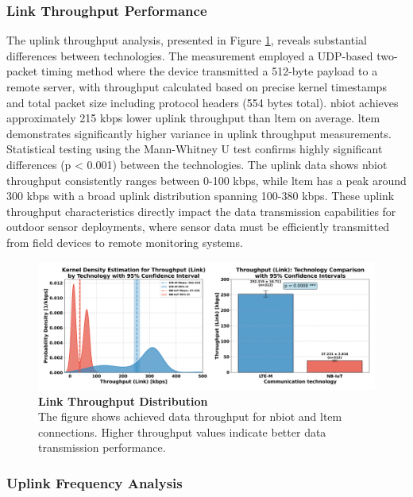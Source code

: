 \documentclass[12pt, english, openany]{book}
\begin{document}
\subsubsection*{Link Throughput Performance} \label{sec:link_throughput_analysis}

The uplink throughput analysis, presented in Figure \ref{fig:throughput_link}, reveals substantial differences between technologies. The measurement employed a UDP-based two-packet timing method where the device transmitted a 512-byte payload to a remote server, with throughput calculated based on precise kernel timestamps and total packet size including protocol headers (554 bytes total). \gls{nbiot} achieves approximately 215 kbps lower uplink throughput than \gls{ltem} on average. \gls{ltem} demonstrates significantly higher variance in uplink throughput measurements. Statistical testing using the Mann-Whitney U test confirms highly significant differences (p < 0.001) between the technologies. The uplink data shows \gls{nbiot} throughput consistently ranges between 0-100 kbps, while \gls{ltem} has a peak around 300 kbps with a broad uplink distribution spanning 100-380 kbps. These uplink throughput characteristics directly impact the data transmission capabilities for outdoor sensor deployments, where sensor data must be efficiently transmitted from field devices to remote monitoring systems.

\begin{figure}[htbp]
    \centering
    \includegraphics[width=1.0\textwidth]{throughput_link_kde_ci.png}
    \caption{\textbf{Link Throughput Distribution} \\ The figure shows achieved data throughput for \gls{nbiot} and \gls{ltem} connections. Higher throughput values indicate better data transmission performance.}
    \label{fig:throughput_link}
\end{figure}
\FloatBarrier
\subsubsection*{Uplink Frequency Analysis} \label{sec:uplink_frequency_analysis}
\end{document}
